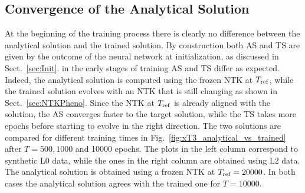 \subsection{Convergence of the Analytical Solution}
\label{sec:CheckAnalyticalConvergence}

At the beginning of the training process there is clearly no difference between the analytical solution and
the trained solution. By construction both AS and TS are given by the outcome of the neural network at initialization, 
as discussed in Sect.~\ref{sec:Init}. in the early stages of training AS and TS differ as expected. Indeed, the
analytical solution is computed using the frozen NTK at $T_{\rm ref}$, while the trained solution evolves with an 
NTK that is still changing as shown in Sect.~\ref{sec:NTKPheno}. Since the NTK at $T_{\rm ref}$ is already aligned 
with the solution, the AS converges faster to the target solution, while the TS takes more epochs before starting 
to evolve in the right direction. The two solutions are compared for different training times in Fig.~\ref{fig:xT3_analytical_vs_trained}
after $T=500, 1000$ and 10000 epochs. The plots in the left column correspond to synthetic L0 data, while the ones 
in the right column are obtained using L2 data. The analytical solution is obtained using a frozen NTK 
at $T_{\rm ref}=20000$. In both cases the analytical solution agrees with the trained one for $T=10000$.

